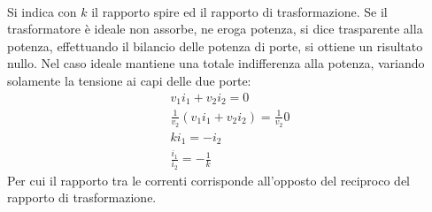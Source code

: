 \documentclass{article}
\numberwithin{equation}{subsection}
\begin{document}
\\
Si indica con $k$ il rapporto spire ed il rapporto di trasformazione. Se il trasformatore è ideale non assorbe, ne eroga potenza, si dice trasparente alla potenza, effettuando 
il bilancio delle potenza di porte, si ottiene un risultato nullo. Nel caso ideale mantiene una totale indifferenza alla potenza, variando solamente la tensione ai capi delle 
due porte:
\begin{gather*}
    v_1i_1+v_2i_2=0\\
    \displaystyle\frac{1}{v_2}\left(v_1i_1+v_2i_2\right)=\frac{1}{v_2}0\\
    ki_1=-i_2\\
    \displaystyle\frac{i_1}{i_2}=-\frac{1}{k}
\end{gather*}
Per cui il rapporto tra le correnti corrisponde all'opposto del reciproco del rapporto di trasformazione. 
\end{document}
